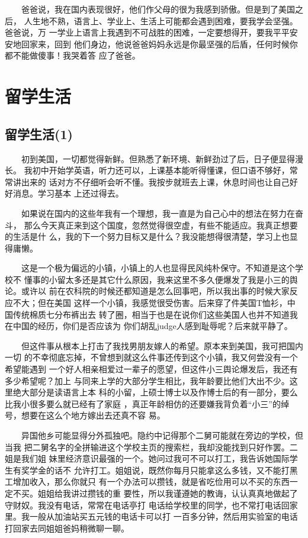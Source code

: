 \documentclass[12pt]{book}
\begin{document}
　　爸爸说，我在国内表现很好，他们作父母的很为我感到骄傲。但是到了美国之后，
人生地不熟，语言上、学业上、生活上可能都会遇到困难，要我学会坚强。爸爸说，万
一学业上语言上我遇到不可战胜的困难，一定要想得开，要我平平安安地回家来，回到
他们身边，他说爸爸妈妈永远是你最坚强的后盾，任何时候你都不能做傻事！我哭着答
应了爸爸。

\chapter{留学生活}
\label{sec-6}
\section{留学生活(1)}
\label{sec-6-1}
　　初到美国，一切都觉得新鲜。但熟悉了新环境、新鲜劲过了后，日子便显得漫长。
我初中开始学英语，听力还可以，上课基本能听得懂课，但口语不够好，常常讲出来的
话对方不仔细听会听不懂。我按步就班去上课，休息时间也让自己好好消息。学习基本
上还过得去。

　　如果说在国内的这些年我有一个理想，我一直是为自己心中的想法在努力在奋斗，
那么今天真正来到这个国度，忽然觉得很空虚，有些不能适应。我真正想要的生活是什
么，我的下一个努力目标又是什么？我没能想得很清楚，学习上也显得庸懒。

　　这是一个极为偏远的小镇，小镇上的人也显得民风纯朴保守。不知道是这个学校不
懂事的小留太多还是其它什么原因，我来这里不多久便爆发了我是小三的舆论。或许以
前在农科院的时候还都知道是怎么回事吧，所以我出事的时候大家反应不大；但在美国
这样一个小镇，我感觉很受伤害。后来穿了件美国T恤衫，中国传统棉质七分布裤出去
转了圈，相当于也是在说你们这些美国人也并不知道我在中国的经历，你们是否应该为
你们胡乱judge人感到耻辱呢？后来就平静了。

　　但这件事从根本上打击了我找男朋友嫁人的希望。原本来到美国，我可把国内一切
的不幸彻底忘掉，不曾想到就这么件事还传到这个小镇，我又何尝没有一个希望能遇到
一个好人相亲相爱过一辈子的愿望，但这件小三舆论爆发后，我还有多少希望呢？加上
与同来上学的大部分学生相比，我年龄要比他们大出不少。这里绝大部分是读语言上本
科的小留，上硕士博士以及作博士后的有一部分，要么比我小很多要么就已经有了家庭
，真正年龄相仿的还要嫌我背负着“小三”的绰号，想要在这么个地方嫁出去还真不容
易。

　　异国他乡可能显得分外孤独吧。隐约中记得那个二舅可能就在旁边的学校，但当我
把二舅名字的全拼输进这个学校主页的搜索栏，我却没能找到只好作罢。二姐是我们姐
妹里经济意识最强的一个。她问过我可不可以打工，我告诉她国际学生有奖学金的话不
允许打工。姐姐说，既然你每月只能拿这么多钱，又不能打黑工增加收入，那么你就只
有一个办法可以攒钱，就是省吃俭用可以不买的东西一定不买。姐姐给我讲过攒钱的重
要性，所以我谨遵她的教诲，认认真真地做起了守财奴。我没有电话，常常在电话亭打
电话给学校里的同学，也不常打电话回家里。我一般从加油站买五元钱的电话卡可以打
一百多分钟，然后用实验室的电话打回家去同姐姐爸妈稍微聊一聊。
\end{document}
